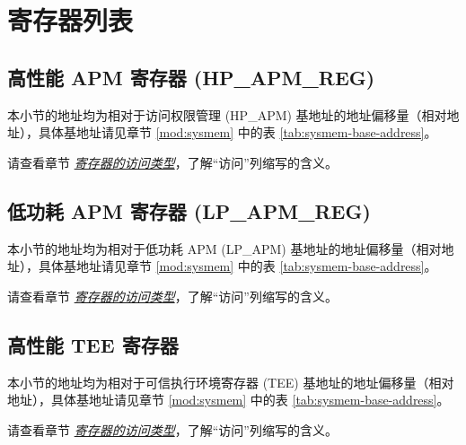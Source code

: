 \documentclass[main\_\_CN.tex]{subfiles}
\begin{document}
\hypertarget{permctrl-reg-summ}{}
\section{寄存器列表}
\label{sec:permctrl-reg-summ}

\subsection{高性能 APM 寄存器 (HP\_APM\_REG)}
\label{sec:permctrl-reg-hp}
本小节的地址均为相对于访问权限管理 (HP\_APM) 基地址的地址偏移量（相对地址），具体基地址请见章节 \ref{mod:sysmem} \textit{} 中的表 \ref{tab:sysmem-base-address}。

请查看章节 \hyperref[glossary-access-types]{\textit{寄存器的访问类型}}，了解“访问”列缩写的含义。



\subsection{低功耗 APM 寄存器 (LP\_APM\_REG)}
\label{sec:permctrl-reg-lp}

本小节的地址均为相对于低功耗 APM (LP\_APM) 基地址的地址偏移量（相对地址），具体基地址请见章节 \ref{mod:sysmem} \textit{} 中的表 \ref{tab:sysmem-base-address}。

请查看章节 \hyperref[glossary-access-types]{\textit{寄存器的访问类型}}，了解“访问”列缩写的含义。







\subsection{高性能 TEE 寄存器}

本小节的地址均为相对于可信执行环境寄存器 (TEE) 基地址的地址偏移量（相对地址），具体基地址请见章节 \ref{mod:sysmem} \textit{} 中的表 \ref{tab:sysmem-base-address}。

请查看章节 \hyperref[glossary-access-types]{\textit{寄存器的访问类型}}，了解“访问”列缩写的含义。









\end{document}
